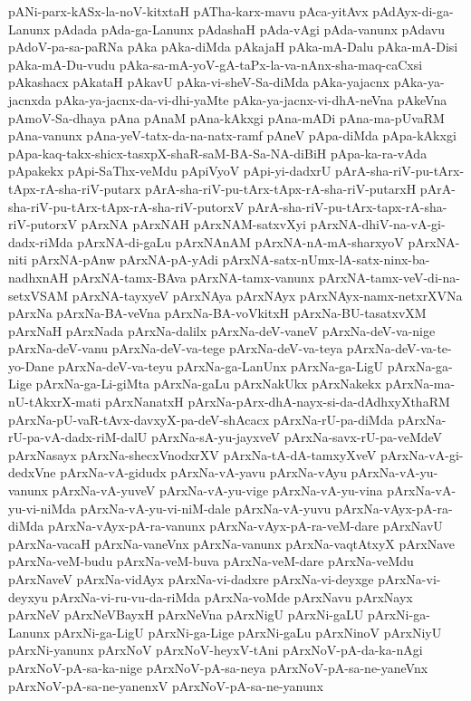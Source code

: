 {pANi-parx-kASx-la-noV-kitxtaH
pATha-karx-mavu
pAca-yitAvx
pAdAyx-di-ga-Lanunx
pAdada
pAda-ga-Lanunx
pAdashaH
pAda-vAgi
pAda-vanunx
pAdavu
pAdoV-pa-sa-paRNa
pAka
pAka-diMda
pAkajaH
pAka-mA-Dalu
pAka-mA-Disi
pAka-mA-Du-vudu
pAka-sa-mA-yoV-gA-taPx-la-va-nAnx-sha-maq-caCxsi
pAkashacx
pAkataH
pAkavU
pAka-vi-sheV-Sa-diMda
pAka-yajacnx
pAka-ya-jacnxda
pAka-ya-jacnx-da-vi-dhi-yaMte
pAka-ya-jacnx-vi-dhA-neVna
pAkeVna
pAmoV-Sa-dhaya
pAna
pAnaM
pAna-kAkxgi
pAna-mADi
pAna-ma-pUvaRM
pAna-vanunx
pAna-yeV-tatx-da-na-natx-ramf
pAneV
pApa-diMda
pApa-kAkxgi
pApa-kaq-takx-shicx-tasxpX-shaR-saM-BA-Sa-NA-diBiH
pApa-ka-ra-vAda
pApakekx
pApi-SaThx-veMdu
pApiVyoV
pApi-yi-dadxrU
pArA-sha-riV-pu-tArx-tApx-rA-sha-riV-putarx
pArA-sha-riV-pu-tArx-tApx-rA-sha-riV-putarxH
pArA-sha-riV-pu-tArx-tApx-rA-sha-riV-putorxV
pArA-sha-riV-pu-tArx-tapx-rA-sha-riV-putorxV
pArxNA
pArxNAH
pArxNAM-satxvXyi
pArxNA-dhiV-na-vA-gi-dadx-riMda
pArxNA-di-gaLu
pArxNAnAM
pArxNA-nA-mA-sharxyoV
pArxNA-niti
pArxNA-pAnw
pArxNA-pA-yAdi
pArxNA-satx-nUmx-lA-satx-ninx-ba-nadhxnAH
pArxNA-tamx-BAva
pArxNA-tamx-vanunx
pArxNA-tamx-veV-di-na-setxVSAM
pArxNA-tayxyeV
pArxNAya
pArxNAyx
pArxNAyx-namx-netxrXVNa
pArxNa
pArxNa-BA-veVna
pArxNa-BA-voVkitxH
pArxNa-BU-tasatxvXM
pArxNaH
pArxNada
pArxNa-dalilx
pArxNa-deV-vaneV
pArxNa-deV-va-nige
pArxNa-deV-vanu
pArxNa-deV-va-tege
pArxNa-deV-va-teya
pArxNa-deV-va-te-yo-Dane
pArxNa-deV-va-teyu
pArxNa-ga-LanUnx
pArxNa-ga-LigU
pArxNa-ga-Lige
pArxNa-ga-Li-giMta
pArxNa-gaLu
pArxNakUkx
pArxNakekx
pArxNa-ma-nU-tAkxrX-mati
pArxNanatxH
pArxNa-pArx-dhA-nayx-si-da-dAdhxyXthaRM
pArxNa-pU-vaR-tAvx-davxyX-pa-deV-shAcacx
pArxNa-rU-pa-diMda
pArxNa-rU-pa-vA-dadx-riM-dalU
pArxNa-sA-yu-jayxveV
pArxNa-savx-rU-pa-veMdeV
pArxNasayx
pArxNa-shecxVnodxrXV
pArxNa-tA-dA-tamxyXveV
pArxNa-vA-gi-dedxVne
pArxNa-vA-gidudx
pArxNa-vA-yavu
pArxNa-vAyu
pArxNa-vA-yu-vanunx
pArxNa-vA-yuveV
pArxNa-vA-yu-vige
pArxNa-vA-yu-vina
pArxNa-vA-yu-vi-niMda
pArxNa-vA-yu-vi-niM-dale
pArxNa-vA-yuvu
pArxNa-vAyx-pA-ra-diMda
pArxNa-vAyx-pA-ra-vanunx
pArxNa-vAyx-pA-ra-veM-dare
pArxNavU
pArxNa-vacaH
pArxNa-vaneVnx
pArxNa-vanunx
pArxNa-vaqtAtxyX
pArxNave
pArxNa-veM-budu
pArxNa-veM-buva
pArxNa-veM-dare
pArxNa-veMdu
pArxNaveV
pArxNa-vidAyx
pArxNa-vi-dadxre
pArxNa-vi-deyxge
pArxNa-vi-deyxyu
pArxNa-vi-ru-vu-da-riMda
pArxNa-voMde
pArxNavu
pArxNayx
pArxNeV
pArxNeVBayxH
pArxNeVna
pArxNigU
pArxNi-gaLU
pArxNi-ga-Lanunx
pArxNi-ga-LigU
pArxNi-ga-Lige
pArxNi-gaLu
pArxNinoV
pArxNiyU
pArxNi-yanunx
pArxNoV
pArxNoV-heyxV-tAni
pArxNoV-pA-da-ka-nAgi
pArxNoV-pA-sa-ka-nige
pArxNoV-pA-sa-neya
pArxNoV-pA-sa-ne-yaneVnx
pArxNoV-pA-sa-ne-yanenxV
pArxNoV-pA-sa-ne-yanunx
}
